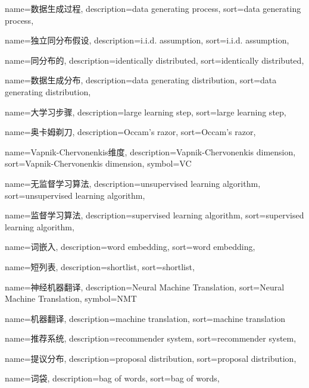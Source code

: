{
  name=数据生成过程,
  description={data generating process},
  sort={data generating process},
}

{
  name=独立同分布假设,
  description={i.i.d. assumption},
  sort={i.i.d. assumption},
}

{
  name=同分布的,
  description={identically distributed},
  sort={identically distributed},
}

{
  name=数据生成分布,
  description={data generating distribution},
  sort={data generating distribution},
}

{
  name=大学习步骤,
  description={large learning step},
  sort={large learning step},
}

{
  name=奥卡姆剃刀,
  description={Occam's razor},
  sort={Occam's razor},
}

{
  name=Vapnik-Chervonenkis维度,
  description={Vapnik-Chervonenkis dimension},
  sort={Vapnik-Chervonenkis dimension},
  symbol={VC}
}

{
  name=无监督学习算法,
  description={unsupervised learning algorithm},
  sort={unsupervised learning algorithm},
}

{
  name=监督学习算法,
  description={supervised learning algorithm},
  sort={supervised learning algorithm},
}

{
  name=词嵌入,
  description={word embedding},
  sort={word embedding},
}

{
  name=短列表,
  description={shortlist},
  sort={shortlist},
}

{
  name=神经机器翻译,
  description={Neural Machine Translation},
  sort={Neural Machine Translation},
  symbol={NMT}
}

{
  name=机器翻译,
  description={machine translation},
  sort={machine translation}
}

{
  name=推荐系统,
  description={recommender system},
  sort={recommender system},
}

{
  name=提议分布,
  description={proposal distribution},
  sort={proposal distribution},
}

{
  name=词袋,
  description={bag of words},
  sort={bag of words},
}

